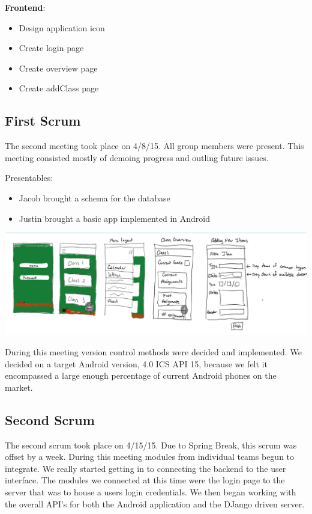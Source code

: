 \documentclass[a4paper]{article} %
\begin{document}
\textbf{Frontend}:
\begin{itemize}
  \item Design application icon
  \item Create login page
    \item Create overview page
    \item Create addClass page
\end{itemize}


\subsection{First Scrum}

The second meeting took place on 4/8/15. All group members were present. This meeting consisted mostly of demoing progress and outling future issues.

Presentables:
\begin{itemize}
  \item Jacob brought a schema for the database
    \item Justin brought a basic app implemented in Android
\end{itemize}
%
%

\centerline{\includegraphics[scale=.75]{Picture1.png}}

During this meeting version control methods were decided and implemented. We decided on a target Android version, 4.0 ICS API 15, because we felt it encompassed a large enough percentage of current Android phones on the market. \\

\subsection{Second Scrum}

The second scrum took place on 4/15/15. Due to Spring Break, this scrum was offset by a week. During this meeting modules from individual teams begun to integrate. We really started getting in to connecting the backend to the user interface. The modules we connected at this time were the login page to the server that was to house a users login credentials. We then began working with the overall API's for both the Android application and the DJango driven server. \\
\end{document}
